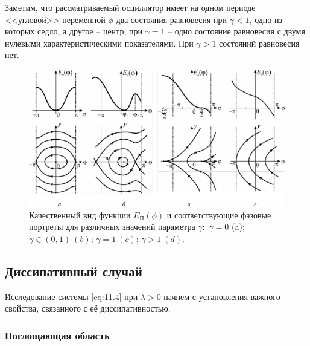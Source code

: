 Заметим, что рассматриваемый осциллятор имеет на одном периоде <<угловой>> переменной $\phi$ два
состояния равновесия при $\gamma<1$, одно из которых седло, а другое -- центр, при $\gamma=1$ --
одно состояние равновесия с двумя нулевыми характеристическими показателями. При $\gamma>1$ 
состояний равновесия нет.

\begin{figure}[h]
        \centering
        \includegraphics[width=\linewidth]{fig/lect11/2}
        \caption{Качественный вид функции $E_{\text{П}}(\phi)$ и соответствующие фазовые портреты
        для различных значений параметра $\gamma:$ 
$\gamma=0$ (a); $\gamma \in (0,1) ~ (b)$; $\gamma=1 ~ (c)$;  $\gamma>1~ (d).$}
        \label{fig:11.2}
\end{figure}

\subsection{Диссипативный случай}%
\label{sub:11.3.2}

Исследование системы \eqref{eq:11.4} при $\lambda>0$ начнем с установления важного свойства, связанного с её диссипативностью.

\subsubsection{Поглощающая область}%
\label{ssub:11.3.2a}

